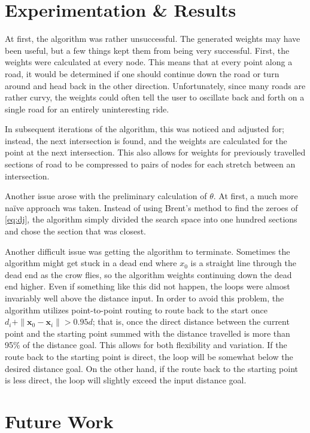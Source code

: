 \documentclass[twocolumn,12pt]{article}
\begin{document}
\section{Experimentation \& Results}

At first, the algorithm was rather unsuccessful. The generated weights may have
been useful, but a few things kept them from being very successful. First, the
weights were calculated at every node. This means that at every point along a
road, it would be determined if one should continue down the road or turn around
and head back in the other direction. Unfortunately, since many roads are rather
curvy, the weights could often tell the user to oscillate back and forth on a
single road for an entirely uninteresting ride.

In subsequent iterations of the algorithm, this was noticed and adjusted for;
instead, the next intersection is found, and the weights are calculated for the
point at the next intersection. This also allows for weights for previously
travelled sections of road to be compressed to pairs of nodes for each stretch
between an intersection.

Another issue arose with the preliminary calculation of $\theta$. At first, a
much more na\"{i}ve approach was taken. Instead of using Brent's method to find
the zeroes of \eqref{eq:dj}, the algorithm simply divided the search space into
one hundred sections and chose the section that was closest. 

Another difficult issue was getting the algorithm to terminate. Sometimes the
algorithm might get stuck in a dead end where $x_0$ is a straight line through
the dead end as the crow flies, so the algorithm weights continuing down the
dead end higher. Even if something like this did not happen, the loops were
almost invariably well above the distance input. In order to avoid this problem,
the algorithm utilizes point-to-point routing to route back to the start once
$d_i + \|\bm{x}_0-\bm{x}_i\| > 0.95d$; that is, once the direct distance between
the current point and the starting point summed with the distance travelled is
more than 95\% of the distance goal. This allows for both flexibility and
variation. If the route back to the starting point is direct, the loop will be
somewhat below the desired distance goal. On the other hand, if the route back
to the starting point is less direct, the loop will slightly exceed the input
distance goal.

\section{Future Work}
\end{document}
